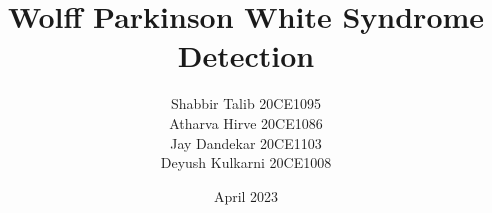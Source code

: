 

\clearpage{}  %



\title{Wolff Parkinson White Syndrome Detection}
\author{Shabbir Talib 20CE1095\\Atharva Hirve 20CE1086\\Jay Dandekar 20CE1103\\Deyush Kulkarni 20CE1008}
\date{April 2023}






\maketitle

